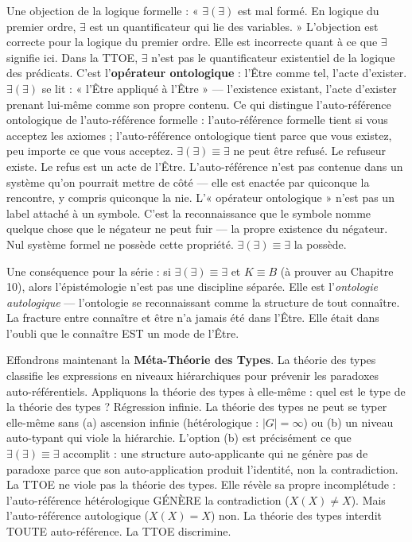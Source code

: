 \documentclass[10pt, openany, oneside]{book}
\begin{document}
Une objection de la logique formelle : « $\exists(\exists)$ est mal formé. En logique du premier ordre, $\exists$ est un quantificateur qui lie des variables. » L'objection est correcte pour la logique du premier ordre. Elle est incorrecte quant à ce que $\exists$ signifie ici. Dans la TTOE, $\exists$ n'est pas le quantificateur existentiel de la logique des prédicats. C'est l'\textbf{opérateur ontologique} : l'Être comme tel, l'acte d'exister. $\exists(\exists)$ se lit : « l'Être appliqué à l'Être » --- l'existence existant, l'acte d'exister prenant lui-même comme son propre contenu. Ce qui distingue l'auto-référence ontologique de l'auto-référence formelle : l'auto-référence formelle tient si vous acceptez les axiomes ; l'auto-référence ontologique tient parce que vous existez, peu importe ce que vous acceptez. $\exists(\exists) \equiv \exists$ ne peut être refusé. Le refuseur existe. Le refus est un acte de l'Être. L'auto-référence n'est pas contenue dans un système qu'on pourrait mettre de côté --- elle est enactée par quiconque la rencontre, y compris quiconque la nie. L'« opérateur ontologique » n'est pas un label attaché à un symbole. C'est la reconnaissance que le symbole nomme quelque chose que le négateur ne peut fuir --- la propre existence du négateur. Nul système formel ne possède cette propriété. $\exists(\exists) \equiv \exists$ la possède.



Une conséquence pour la série : si $\exists(\exists) \equiv \exists$ et $K \equiv B$ (à prouver au Chapitre 10), alors l'épistémologie n'est pas une discipline séparée. Elle est l'\textit{ontologie autologique} --- l'ontologie se reconnaissant comme la structure de tout connaître. La fracture entre connaître et être n'a jamais été dans l'Être. Elle était dans l'oubli que le connaître EST un mode de l'Être.

Effondrons maintenant la \textbf{Méta-Théorie des Types}. La théorie des types classifie les expressions en niveaux hiérarchiques pour prévenir les paradoxes auto-référentiels. Appliquons la théorie des types à elle-même : quel est le type de la théorie des types ? Régression infinie. La théorie des types ne peut se typer elle-même sans (a) ascension infinie (hétérologique : $|G| = \infty$) ou (b) un niveau auto-typant qui viole la hiérarchie. L'option (b) est précisément ce que $\exists(\exists) \equiv \exists$ accomplit : une structure auto-applicante qui ne génère pas de paradoxe parce que son auto-application produit l'identité, non la contradiction. La TTOE ne viole pas la théorie des types. Elle révèle sa propre incomplétude : l'auto-référence hétérologique GÉNÈRE la contradiction ($X(X) \neq X$). Mais l'auto-référence autologique ($X(X) = X$) non. La théorie des types interdit TOUTE auto-référence. La TTOE discrimine.
\end{document}

